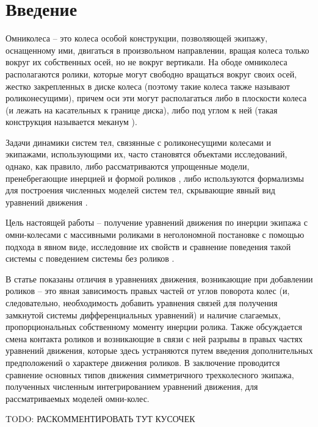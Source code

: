\section{Введение}

Омниколеса -- это колеса особой конструкции, позволяющей экипажу, оснащенному ими, двигаться в произвольном направлении, вращая колеса только вокруг их собственных осей, но не вокруг вертикали. На ободе омниколеса располагаются ролики, которые могут свободно вращаться вокруг своих осей, жестко закрепленных в диске колеса (поэтому такие колеса также называют роликонесущими), причем оси эти могут располагаться либо в плоскости колеса (и лежать на касательных к границе диска), либо под углом к ней (такая конструкция называется меканум \cite{mecanum}).

Задачи динамики систем тел, связянные с роликонесущими колесами и экипажами, использующими их, часто становятся объектами исследований, однако, как правило, либо рассматриваются упрощенные модели, пренебрегающие инерцией и формой роликов \cite{ZobovaTatarinov, Martynenko, Borisov, 5to9FromZobova2011}, либо используются формализмы для построения численных моделей систем тел, скрывающие явный вид уравнений движения \cite{KosenkoGerasimov, MaybeTobolar, Others, 3to4FromZobova2011}.

Цель настоящей работы -- получение уравнений движения по инерции экипажа с омни-колесами с массивными роликами в неголономной постановке с помощью подхода \cite{Tatarinov} в явном виде, исследовние их свойств и сравнение поведения такой системы с поведением системы без роликов \cite{Zobova2011}.

В статье показаны отличия в уравнениях движения, возникающие при добавлении роликов -- это явная зависимость правых частей от углов поворота колес (и, следовательно, необходимость добавить уравнения связей для получения замкнутой системы дифференциальных уравнений) и наличие слагаемых, пропорциональных собственному моменту инерции ролика. Также обсуждается смена контакта роликов и возникающие в связи с ней разрывы в правых частях уравнений движения, которые здесь устраняются путем введения дополнительных предположений о характере движения роликов. В заключение проводится сравнение основных типов движения симметричного трехколесного экипажа, полученных численным интегрированием уравнений движения, для рассматриваемых моделей омни-колес.

TODO: РАСКОММЕНТИРОВАТЬ ТУТ КУСОЧЕК



